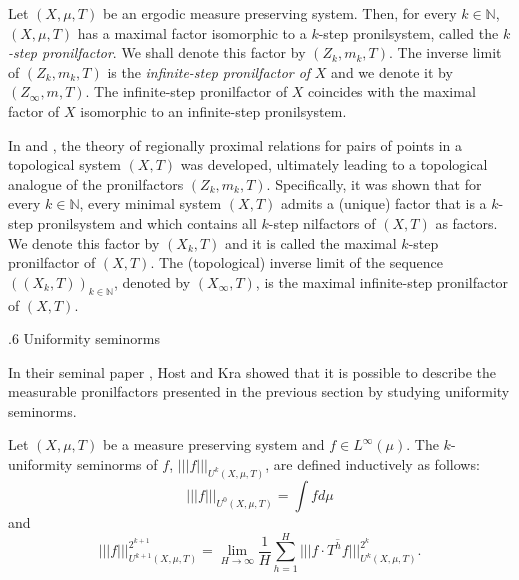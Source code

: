 \documentclass[reqno]{amsart}
\makeatletter
\def\N{{\mathbb N}}
\newcommand{\norm}[1]{\left\Vert #1\right\Vert}
\newcommand{\nnorm}[1]{\lvert\!|\!| #1|\!|\!\rvert}
\theoremstyle{definition}
\def\subsection{\@startsection{subsection}{2}%
  \z@{.4\linespacing\@plus.7\linespacing}
{.6\baselineskip}%
  {\normalfont\centering\bfseries}%
}
\theoremstyle{remark}
\def\N{{\mathbb N}}
\makeatother
\begin{document}
Let $(X,\mu,T)$ be an ergodic measure preserving system. Then, for 
every $k \in \N$, $(X, \mu,T)$ has a maximal factor isomorphic to 
a $k$-step pronilsystem, called the $k$\emph{-step pronilfactor}. 
We shall denote this factor by $(Z_k,m_k,T)$. The inverse limit of 
$(Z_k,m_k,T)$ is the \emph{infinite-step pronilfactor of} $X$ and 
we denote it by $(Z_{\infty}, m,T)$. The infinite-step 
pronilfactor of $X$ coincides with the maximal factor of $X$ 
isomorphic to an infinite-step pronilsystem.  

In \cite{Host_Kra_Maass_nilsequences} and 
\cite{Shao_Ye_regionally_prox_orderd:2012}, the theory of 
regionally proximal relations for pairs of points in a topological system 
$(X,T)$ was developed, ultimately leading to a topological 
analogue of the pronilfactors $(Z_k,m_k,T)$. Specifically, it was 
shown that for every $k\in \N$, every minimal system $(X,T)$ 
admits a (unique) factor that is a $k$-step pronilsystem and which 
contains all $k$-step nilfactors of $(X,T)$ as factors. We denote 
this factor by $(X_k,T)$ and it is called the maximal $k$-step 
pronilfactor of $(X,T)$. The (topological) inverse limit of the sequence 
$((X_k,T))_{k\in \N}$, denoted by $(X_{\infty},T)$, is the maximal 
infinite-step pronilfactor of $(X,T)$.  

\subsection{Uniformity seminorms}

In their seminal paper 
\cite{Host_Kra_nonconventional_averages_nilmanifolds:2005}, Host 
and Kra  showed that it is possible to describe the measurable 
pronilfactors presented in the previous section by studying 
uniformity seminorms.  

Let $(X, \mu,T)$ be a measure preserving system and $f \in L^{\infty}(\mu)$. The $k$-uniformity seminorms of $f$, $\nnorm{f}_{U^{k}(X,\mu,T)}$, are defined inductively as follows: 
    \begin{equation*}
        \nnorm{f}_{U^0(X, \mu,T)} =  \int f d\mu 
    \end{equation*}
    and 
    \begin{equation} \label{eq def seminorm}
        \nnorm{ f}_{U^{k+1}(X, \mu,T)}^{2^{k+1}}= \lim_{H \to \infty }\frac{1}{H} \sum_{h=1}^{H} \nnorm{f \cdot \overline{T^hf}}_{U^k(X, \mu,T)}^{2^k}.
    \end{equation}

\end{document}
